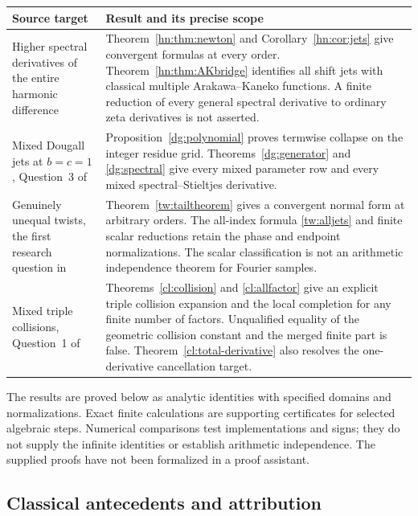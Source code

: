 \documentclass[11pt,a4paper]{article}
\numberwithin{equation}{section}
\theoremstyle{definition}
\theoremstyle{remark}
\begin{document}
\begin{longtable}{@{}>{\raggedright\arraybackslash}p{}>{\raggedright\arraybackslash}p{}@{}}
\toprule
Source target & Result and its precise scope\\
\midrule
\endhead
Higher spectral derivatives of the entire harmonic difference
\cite{RepoExact}
& Theorem~\ref{hn:thm:newton} and Corollary~\ref{hn:cor:jets}
give convergent formulas at every order. Theorem~\ref{hn:thm:AKbridge}
identifies all shift jets with classical multiple Arakawa--Kaneko
functions. A finite reduction of every general spectral derivative
to ordinary zeta derivatives is not asserted.\\[6pt]
Mixed Dougall jets at $b=c=1$, Question~3 of \cite{RepoTransport}
& Proposition~\ref{dg:polynomial} proves termwise collapse on the
integer residue grid. Theorems~\ref{dg:generator} and
\ref{dg:spectral} give every mixed parameter row and every
mixed spectral--Stieltjes derivative.\\[6pt]
Genuinely unequal twists, the first research question in \cite{RepoTwisted}
& Theorem~\ref{tw:tailtheorem} gives a convergent normal form at
arbitrary orders. The all-index formula \eqref{tw:alljets}
and finite scalar reductions retain the phase and endpoint
normalizations. The scalar classification is not an arithmetic
independence theorem for Fourier samples.\\[6pt]
Mixed triple collisions, Question~1 of \cite{RepoExact}
& Theorems~\ref{cl:collision} and \ref{cl:allfactor} give an
explicit triple collision expansion and the local completion for
any finite number of factors. Unqualified equality of the geometric
collision constant and the merged finite part is false. Theorem~\ref{cl:total-derivative} also resolves the one-derivative cancellation target.\\
\bottomrule
\end{longtable}

The results are proved below as analytic identities with specified
domains and normalizations. Exact finite calculations are supporting
certificates for selected algebraic steps. Numerical comparisons
test implementations and signs; they do not supply the infinite
identities or establish arithmetic independence. The supplied proofs
have not been formalized in a proof assistant.

\subsection{Classical antecedents and attribution}
\end{document}

